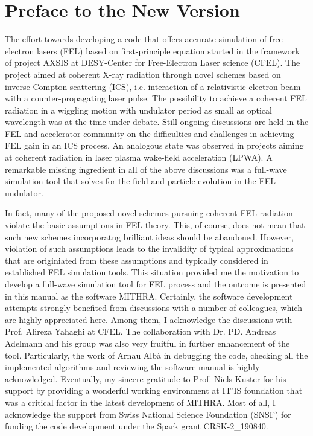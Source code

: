 \chapter{Preface to the New Version}
\label{chapter_preface}

The effort towards developing a code that offers accurate simulation of free-electron lasers (FEL) based on first-principle equation started in the framework of project AXSIS at DESY-Center for Free-Electron Laser science (CFEL).
%
The project aimed at coherent X-ray radiation through novel schemes based on inverse-Compton scattering (ICS), i.e. interaction of a relativistic electron beam with a counter-propagating laser pulse.
%
The possibility to achieve a coherent FEL radiation in a wiggling motion with undulator period as small as optical wavelength was at the time under debate.
%
Still ongoing discussions are held in the FEL and accelerator community on the difficulties and challenges in achieving FEL gain in an ICS process.
%
An analogous state was observed in projects aiming at coherent radiation in laser plasma wake-field acceleration (LPWA). 
%
A remarkable missing ingredient in all of the above discussions was a full-wave simulation tool that solves for the field and particle evolution in the FEL undulator.

In fact, many of the proposed novel schemes pursuing coherent FEL radiation violate the basic assumptions in FEL theory.
%
This, of course, does not mean that such new schemes incorporatng brilliant ideas should be abandoned.
%
However, violation of such assumptions leads to the invalidity of typical approximations that are originiated from these assumptions and typically considered in established FEL simulation tools.
%
This situation provided me the motivation to develop a full-wave simulation tool for FEL process and the outcome is presented in this manual as the software MITHRA.
%
Certainly, the software development attempts strongly benefited from discussions with a number of colleagues, which are highly appreciated here.
%
Among them, I acknowledge the discussions with Prof. Alireza Yahaghi at CFEL.
%
The collaboration with Dr. PD. Andreas Adelmann and his group was also very fruitful in further enhancement of the tool.
%
Particularly, the work of Arnau Alb\`{a} in debugging the code, checking all the implemented algorithms and reviewing the software manual is highly acknowledged.
%
Eventually, my sincere gratitude to Prof. Niels Kuster for his support by providing a wonderful working environment at IT'IS foundation that was a critical factor in the latest development of MITHRA.
%
Most of all, I acknowledge the support from Swiss National Science Foundation (SNSF) for funding the code development under the Spark grant CRSK-2\_190840.

